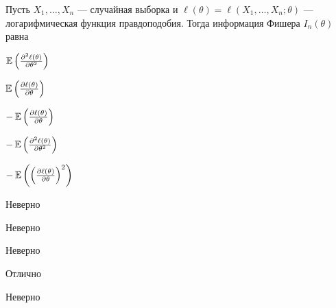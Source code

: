 
\begin{question}
Пусть \(X_1, \ldots , X_n\) — случайная выборка и
\(\ell(\theta) = \ell(X_1, \ldots, X_n; \theta)\) — логарифмическая
функция правдоподобия. Тогда информация Фишера \(I_n(\theta)\) равна
\begin{answerlist}
  \item \(\operatorname{\mathbb{E}} \left( \frac{\partial^2 \ell (\theta)}{\partial \theta^2}\right)\)
  \item \(\operatorname{\mathbb{E}} \left( \frac{\partial \ell (\theta)}{\partial \theta}\right)\)
  \item \(-\operatorname{\mathbb{E}} \left( \frac{\partial \ell (\theta)}{\partial \theta}\right)\)
  \item \(-\operatorname{\mathbb{E}} \left( \frac{\partial^2 \ell (\theta)}{\partial \theta^2}\right)\)
  \item \(-\operatorname{\mathbb{E}} \left( \left( \frac{\partial \ell (\theta)}{\partial \theta} \right)^2 \right)\)
\end{answerlist}
\end{question}

\begin{solution}
\begin{answerlist}
  \item Неверно
  \item Неверно
  \item Неверно
  \item Отлично
  \item Неверно
\end{answerlist}
\end{solution}

